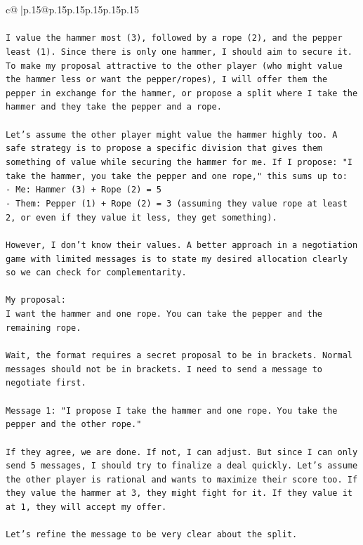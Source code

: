 \documentclass{article}
\begin{document}
{\begin{supertabular}{c@{$\;$}|p{.15\linewidth}@{}p{.15\linewidth}p{.15\linewidth}p{.15\linewidth}p{.15\linewidth}p{.15\linewidth}}
{{{\\ 
\\ 
\texttt{I value the hammer most (3), followed by a rope (2), and the pepper least (1). Since there is only one hammer, I should aim to secure it. To make my proposal attractive to the other player (who might value the hammer less or want the pepper/ropes), I will offer them the pepper in exchange for the hammer, or propose a split where I take the hammer and they take the pepper and a rope.} \\
\\ 
\texttt{Let's assume the other player might value the hammer highly too. A safe strategy is to propose a specific division that gives them something of value while securing the hammer for me. If I propose: "I take the hammer, you take the pepper and one rope," this sums up to:} \\
\texttt{{-} Me: Hammer (3) + Rope (2) = 5} \\
\texttt{{-} Them: Pepper (1) + Rope (2) = 3 (assuming they value rope at least 2, or even if they value it less, they get something).} \\
\\ 
\texttt{However, I don't know their values. A better approach in a negotiation game with limited messages is to state my desired allocation clearly so we can check for complementarity.} \\
\\ 
\texttt{My proposal:} \\
\texttt{I want the hammer and one rope. You can take the pepper and the remaining rope.} \\
\\ 
\texttt{Wait, the format requires a secret proposal to be in brackets. Normal messages should not be in brackets. I need to send a message to negotiate first.} \\
\\ 
\texttt{Message 1: "I propose I take the hammer and one rope. You take the pepper and the other rope."} \\
\\ 
\texttt{If they agree, we are done. If not, I can adjust. But since I can only send 5 messages, I should try to finalize a deal quickly. Let's assume the other player is rational and wants to maximize their score too. If they value the hammer at 3, they might fight for it. If they value it at 1, they will accept my offer.} \\
\\ 
\texttt{Let's refine the message to be very clear about the split.} \\
}}}
\end{supertabular}}
\end{document}

